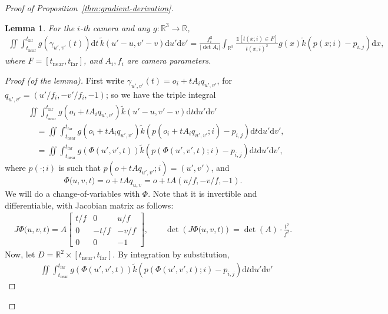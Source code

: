 \documentclass{article}
\newtheorem{lemma}[theorem]{Lemma}
\newcommand{\R}{\mathbb{R}}
\newcommand{\ind}{\mathds{1}}
\newcommand{\dif}{\mathrm{d}}
\newcommand{\near}{\mathrm{near}}
\newcommand{\far}{\mathrm{far}}
\begin{document}
\begin{proof}[Proof of Proposition~\ref{thm:gradient-derivation}]
    \begin{lemma}
        For the $i$-th camera and any $g : \R^3 \to \R$,
        {\small
        \begin{align*}
            \iint \int_{t_\near}^{t_\far} g(\gamma_{u',v'}(t)) \dif t \, \widetilde{k}(u'-u,v'-v) \dif u' \dif v'
            = \frac{f_i^2}{\lvert \det A_i \rvert} \int_{\R^3} \frac{\ind[t(x; i) \in F]}{t(x; i)^2} g(x) \widetilde{k}(p(x; i)-p_{i,j}) \dif x,
        \end{align*}
        }
        where $F = [t_\near, t_\far]$, and $A_i, f_i$ are camera parameters.
    \end{lemma}
    \begin{proof}[Proof (of the lemma)]
        First write $\gamma_{u',v'}(t) = o_i + t A_i q_{u',v'}$, for $q_{u',v'} = (u'/f_i, -v'/f_i, -1)$;
        so we have the triple integral
        \begin{align*}
            & \iint \int_{t_\near}^{t_\far} g(o_i + t A_i q_{u',v'}) \widetilde{k}(u'-u,v'-v) \dif t \dif u' \dif v'
            \\ &\quad = \iint \int_{t_\near}^{t_\far} g(o_i + t A_i q_{u',v'}) \widetilde{k}(p(o_i + t A_i q_{u',v'}; i)-p_{i,j}) \dif t \dif u' \dif v',
            \\ &\quad = \iint \int_{t_\near}^{t_\far} g(\Phi(u',v',t)) \widetilde{k}(p(\Phi(u',v',t); i)-p_{i,j}) \dif t \dif u' \dif v',
        \end{align*}
        where $p(\cdot; i)$ is such that $p(o + t A q_{u',v'}; i) = (u',v')$, and
        \[ \Phi\bigl(u, v, t\bigr) = o + t A q_{u,v} = o + t A (u/f, -v/f, -1). \]
        We will do a change-of-variables with $\Phi$.
        Note that it is invertible and differentiable, with Jacobian matrix as follows:
        \begin{align*}
            J\Phi\bigl(u, v, t\bigr) = A \begin{bmatrix}
                t/f & 0 & u/f
                \\
                0 & -t/f & -v/f
                \\
                0 & 0 & -1
            \end{bmatrix},
            \qquad
            \det\left(J\Phi\bigl(u, v, t\bigr)\right) = \det(A) \cdot \frac{t^2}{f^2}.
        \end{align*}
        Now, let $D = \R^2 \times [t_\near, t_\far]$.
        By integration by substitution,
        \begin{align*}
            & \iint \int_{t_\near}^{t_\far} g(\Phi(u',v',t)) \widetilde{k}(p(\Phi(u',v',t); i)-p_{i,j}) \dif t \dif u' \dif v'

\end{align*}
\end{proof}
\end{proof}
\end{document}
